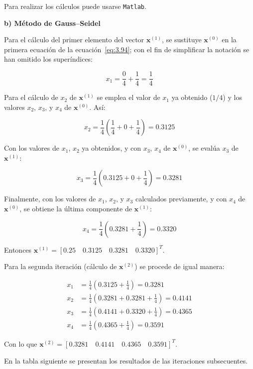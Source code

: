 \documentclass[12pt,letterpaper]{article}
\theoremstyle{definition}
\theoremstyle{plain}
\theoremstyle{remark}
\begin{document}
\noindent
Para realizar los cálculos puede usarse \texttt{Matlab}.



\textbf{b) Método de Gauss–Seidel}

Para el cálculo del primer elemento del vector $\mathbf{x}^{(1)}$, se sustituye $\mathbf{x}^{(0)}$ en la primera ecuación de la ecuación~\eqref{eq:3.94}; con el fin de simplificar la notación se han omitido los superíndices:

\[
x_1 = \frac{0}{4} + \frac{1}{4} = \frac{1}{4}
\]

Para el cálculo de $x_2$ de $\mathbf{x}^{(1)}$ se emplea el valor de $x_1$ ya obtenido ($1/4$) y los valores $x_2$, $x_3$, y $x_4$ de $\mathbf{x}^{(0)}$. Así:

\[
x_2 = \frac{1}{4} \left( \frac{1}{4} + 0 + \frac{1}{4} \right) = 0.3125
\]

Con los valores de $x_1$, $x_2$ ya obtenidos, y con $x_3$, $x_4$ de $\mathbf{x}^{(0)}$, se evalúa $x_3$ de $\mathbf{x}^{(1)}$:

\[
x_3 = \frac{1}{4} \left( 0.3125 + 0 + \frac{1}{4} \right) = 0.3281
\]

Finalmente, con los valores de $x_1$, $x_2$, y $x_3$ calculados previamente, y con $x_4$ de $\mathbf{x}^{(0)}$, se obtiene la última componente de $\mathbf{x}^{(1)}$:

\[
x_4 = \frac{1}{4} (0.3281 + \frac{1}{4}) = 0.3320
\]

Entonces $\mathbf{x}^{(1)} = [0.25 \quad 0.3125 \quad 0.3281 \quad 0.3320]^T$.

Para la segunda iteración (cálculo de $\mathbf{x}^{(2)}$) se procede de igual manera:

\[
\begin{aligned}
x_1 &= \frac{1}{4} (0.3125 + \frac{1}{4}) = 0.3281 \\
x_2 &= \frac{1}{4} (0.3281 + 0.3281 + \frac{1}{4}) = 0.4141 \\
x_3 &= \frac{1}{4} (0.4141 + 0.3320 + \frac{1}{4}) = 0.4365 \\
x_4 &= \frac{1}{4} (0.4365 + \frac{1}{4}) = 0.3591
\end{aligned}
\]

Con lo que $\mathbf{x}^{(2)} = [0.3281 \quad 0.4141 \quad 0.4365 \quad 0.3591]^T$.

En la tabla siguiente se presentan los resultados de las iteraciones subsecuentes.
\end{document}
